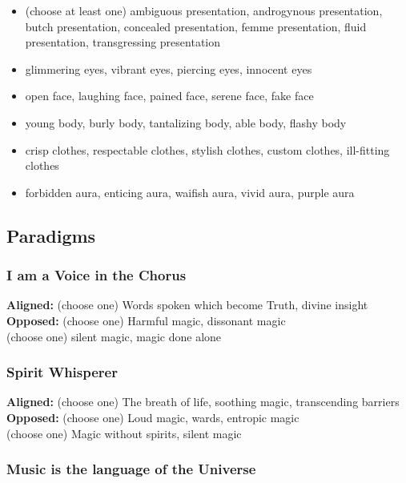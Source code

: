 \documentclass[
  oneside,
  statementpaper,
  9pt]{memoir}
\begin{document}
\begin{itemize}
\tightlist
\item
  (choose at least one) ambiguous presentation, androgynous
  presentation, butch presentation, concealed presentation, femme
  presentation, fluid presentation, transgressing presentation
\item
  glimmering eyes, vibrant eyes, piercing eyes, innocent eyes
\item
  open face, laughing face, pained face, serene face, fake face
\item
  young body, burly body, tantalizing body, able body, flashy body
\item
  crisp clothes, respectable clothes, stylish clothes, custom clothes,
  ill-fitting clothes
\item
  forbidden aura, enticing aura, waifish aura, vivid aura, purple aura
\end{itemize}

\hypertarget{paradigms-7}{%
\subsection{Paradigms}\label{paradigms-7}}

\hypertarget{i-am-a-voice-in-the-chorus}{%
\subsubsection{I am a Voice in the
Chorus}\label{i-am-a-voice-in-the-chorus}}

\textbf{Aligned:} (choose one) Words spoken which become Truth, divine
insight\\
\textbf{Opposed:} (choose one) Harmful magic, dissonant magic\\
(choose one) silent magic, magic done alone

\hypertarget{spirit-whisperer}{%
\subsubsection{Spirit Whisperer}\label{spirit-whisperer}}

\textbf{Aligned:} (choose one) The breath of life, soothing magic,
transcending barriers\\
\textbf{Opposed:} (choose one) Loud magic, wards, entropic magic\\
(choose one) Magic without spirits, silent magic

\hypertarget{music-is-the-language-of-the-universe}{%
\subsubsection{Music is the language of the
Universe}\label{music-is-the-language-of-the-universe}}
\end{document}

